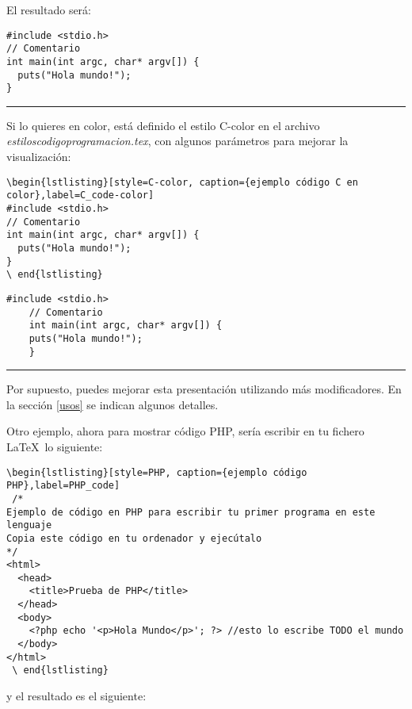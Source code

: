 El resultado será:
\begin{lstlisting}[style=C, caption={ejemplo código C},label=C_code]
#include <stdio.h>
// Comentario
int main(int argc, char* argv[]) {
  puts("Hola mundo!");
}
\end{lstlisting}
\vspace{1em}
\noindent\hrule
\vspace{1em}
Si lo quieres en color, está definido el estilo C-color en el archivo \textit{estiloscodigoprogramacion.tex}, con algunos parámetros para mejorar la visualización:
\begin{lstlisting}[style=Latex-color]
\begin{lstlisting}[style=C-color, caption={ejemplo código C en color},label=C_code-color]
#include <stdio.h>
// Comentario
int main(int argc, char* argv[]) {
  puts("Hola mundo!");
}
\ end{lstlisting}
\end{lstlisting}
\begin{lstlisting}[style=C-color, caption={ejemplo código C en color},label=C_code-color]
	#include <stdio.h>
	// Comentario
	int main(int argc, char* argv[]) {
  	puts("Hola mundo!");
	}
\end{lstlisting}
\vspace{1em}
\noindent\hrule
\vspace{1em}
Por supuesto, puedes mejorar esta presentación utilizando más modificadores. En la sección \ref{usos} se indican algunos detalles.

Otro ejemplo, ahora para mostrar código PHP, sería escribir en tu fichero \LaTeX~lo siguiente:
\begin{lstlisting}[style=Latex-color,numbers=none]
 \begin{lstlisting}[style=PHP, caption={ejemplo código PHP},label=PHP_code]
 /* 
Ejemplo de código en PHP para escribir tu primer programa en este lenguaje
Copia este código en tu ordenador y ejecútalo
*/
<html>
  <head>
    <title>Prueba de PHP</title>
  </head>
  <body>
    <?php echo '<p>Hola Mundo</p>'; ?> //esto lo escribe TODO el mundo
  </body>
</html>
 \ end{lstlisting}
\end{lstlisting}
 
 y el resultado es el siguiente:
 
